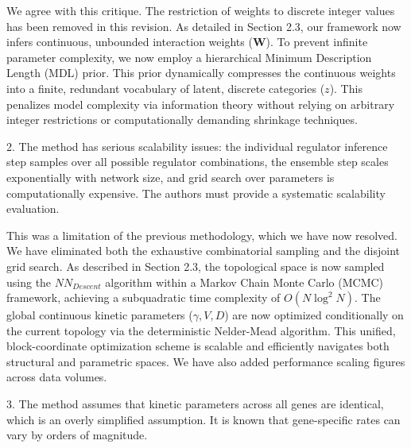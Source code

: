 \documentclass[11pt,a4paper]{article}
\begin{document}
We agree with this critique. The restriction of weights to discrete integer values has been removed in this revision. As detailed in Section 2.3, our framework now infers continuous, unbounded interaction weights ($\mathbf{W}$). To prevent infinite parameter complexity, we now employ a hierarchical Minimum Description Length (MDL) prior. This prior dynamically compresses the continuous weights into a finite, redundant vocabulary of latent, discrete categories ($z$). This penalizes model complexity via information theory without relying on arbitrary integer restrictions or computationally demanding shrinkage techniques.

\begin{reviewercomment}
2. The method has serious scalability issues: the individual regulator inference step samples over all possible regulator combinations, the ensemble step scales exponentially with network size, and grid search over parameters is computationally expensive. The authors must provide a systematic scalability evaluation.
\end{reviewercomment}

This was a limitation of the previous methodology, which we have now resolved. We have eliminated both the exhaustive combinatorial sampling and the disjoint grid search. As described in Section 2.3, the topological space is now sampled using the $NN_{Descent}$ algorithm within a Markov Chain Monte Carlo (MCMC) framework, achieving a subquadratic time complexity of $O(N \log^2 N)$. 
The global continuous kinetic parameters ($\gamma, V, D$) are now optimized conditionally on the current topology via the deterministic Nelder-Mead algorithm. This unified, block-coordinate optimization scheme is scalable and efficiently navigates both structural and parametric spaces. We have also added performance scaling figures across data volumes.

\begin{reviewercomment}
3. The method assumes that kinetic parameters across all genes are identical, which is an overly simplified assumption. It is known that gene-specific rates can vary by orders of magnitude.
\end{reviewercomment}
\end{document}
